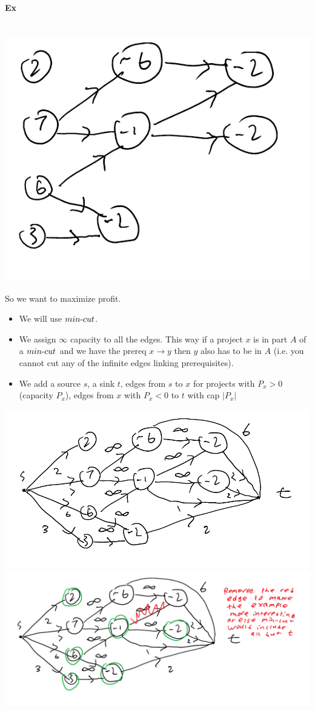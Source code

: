\documentclass[12 pt]{article}
\begin{document}
        \paragraph{Ex}
        ~\\\includegraphics[width=.9\textwidth]{i92.pdf}

        So we want to maximize profit.
        \begin{itemize}
        \item We will use $min\hbox{-}cut$.
        \item We assign $\infty$ capacity to all the edges. This way
          if a project $x$ is in part $A$ of a $min\hbox{-}cut$ and we
          have the prereq $x \to y$ then $y$ also has to be in $A$
          (i.e. you cannot cut any of the infinite edges linking
          prerequisites).
        \item We add a source $s$, a sink $t$, edges from $s$ to $x$
          for projects with $P_x > 0$ (capacity $P_x$), edges from $x$
          with $P_x < 0$ to $t$ with cap $|P_x|$
        \end{itemize}
        \includegraphics[width=.9\textwidth]{i93.pdf}
        \\ \includegraphics[width=.9\textwidth]{i94.pdf}
\end{document}
